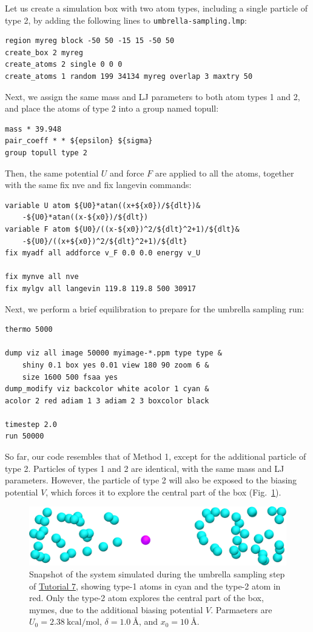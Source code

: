 \documentclass[9pt,tutorial]{livecoms}
\newcommand{\lmpcmd}[1]{\hspace{0pt}\colorbox{listing}{\textcolor{command}{\small{#1}}}\hspace{0pt}} %
\newcommand{\flecmd}[1]{\textcolor{command}{\texttt{#1}}} %
\begin{document}
Let us create a simulation box with two atom types, including a single particle of type 2,
by adding the following lines to \flecmd{umbrella-sampling.lmp}:
\begin{lstlisting}
region myreg block -50 50 -15 15 -50 50
create_box 2 myreg
create_atoms 2 single 0 0 0
create_atoms 1 random 199 34134 myreg overlap 3 maxtry 50
\end{lstlisting}
Next, we assign the same mass and LJ parameters to both atom types
1 and 2, and place the atoms of type 2 into a group named \lmpcmd{topull}:
\begin{lstlisting}
mass * 39.948
pair_coeff * * ${epsilon} ${sigma}
group topull type 2
\end{lstlisting}
Then, the same potential $U$ and force $F$ are applied to all the atoms,
together with the same \lmpcmd{fix nve} and \lmpcmd{fix langevin} commands:
\begin{lstlisting}
variable U atom ${U0}*atan((x+${x0})/${dlt})&
    -${U0}*atan((x-${x0})/${dlt})
variable F atom ${U0}/((x-${x0})^2/${dlt}^2+1)/${dlt}&
    -${U0}/((x+${x0})^2/${dlt}^2+1)/${dlt}
fix myadf all addforce v_F 0.0 0.0 energy v_U

fix mynve all nve
fix mylgv all langevin 119.8 119.8 500 30917
\end{lstlisting}
Next, we perform a brief equilibration to prepare for the
umbrella sampling run:
\begin{lstlisting}
thermo 5000

dump viz all image 50000 myimage-*.ppm type type &
    shiny 0.1 box yes 0.01 view 180 90 zoom 6 &
    size 1600 500 fsaa yes
dump_modify viz backcolor white acolor 1 cyan &
acolor 2 red adiam 1 3 adiam 2 3 boxcolor black

timestep 2.0
run 50000
\end{lstlisting}

So far, our code resembles that of Method 1, except for the additional particle
of type 2.  Particles of types 1 and 2 are identical, with the same mass
and LJ parameters.  However, the particle of type 2 will also
be exposed to the biasing potential $V$, which forces it to explore the
central part of the box (Fig.~\ref{fig:US-system-biased}).

\begin{figure}
\centering
\includegraphics[width=\linewidth]{US-system-biased}
\caption{Snapshot of the system simulated during the umbrella sampling
step of \hyperref[umbrella-sampling-label]{Tutorial 7}, showing type-1 atoms
in cyan and the type-2 atom in red.  Only the type-2 atom explores the central part of the box,
\lmpcmd{mymes}, due to the additional biasing potential $V$. Parmaeters are
$U_0 = 2.38~\text{kcal/mol}$, $\delta = 1.0~\text{\AA{}}$, and $x_0 = 10~\text{\AA{}}$.}
\label{fig:US-system-biased}
\end{figure}
\end{document}
